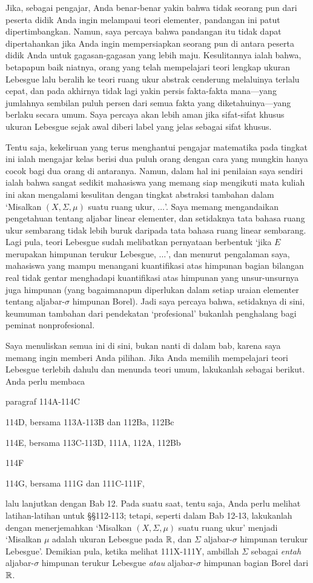 Jika, sebagai pengajar, Anda benar-benar yakin bahwa tidak seorang pun
dari peserta didik Anda ingin melampaui teori elementer, pandangan ini
patut dipertimbangkan. Namun, saya percaya bahwa pandangan itu tidak dapat
dipertahankan jika Anda ingin mempersiapkan seorang pun di antara peserta
didik Anda untuk gagasan-gagasan yang lebih maju. Kesulitannya ialah bahwa, betapapun baik
niatnya, orang yang telah mempelajari teori lengkap ukuran Lebesgue lalu
beralih ke teori ruang ukur abstrak cenderung melaluinya terlalu cepat,
dan pada akhirnya tidak lagi yakin persis fakta-fakta mana—yang jumlahnya
sembilan puluh persen dari semua fakta yang diketahuinya—yang berlaku secara
umum. Saya percaya akan lebih aman jika
sifat-sifat khusus ukuran Lebesgue sejak awal diberi label yang jelas
sebagai sifat khusus.

Tentu saja, kekeliruan yang terus menghantui pengajar matematika pada
tingkat ini ialah mengajar kelas berisi dua puluh orang dengan cara yang
mungkin hanya cocok bagi dua orang di antaranya. Namun, dalam hal ini
penilaian saya sendiri ialah bahwa sangat sedikit mahasiswa yang memang
siap mengikuti mata kuliah ini akan mengalami kesulitan dengan tingkat
abstraksi tambahan dalam `Misalkan $(X,\Sigma,\mu)$ suatu ruang ukur,
$\ldots$'. Saya memang mengandaikan pengetahuan tentang aljabar linear
elementer, dan setidaknya tata bahasa ruang ukur sembarang tidak lebih
buruk daripada tata bahasa ruang linear sembarang. Lagi pula, teori
Lebesgue sudah melibatkan pernyataan berbentuk `jika $E$ merupakan
himpunan terukur Lebesgue, $\ldots$', dan menurut pengalaman saya,
mahasiswa yang mampu menangani kuantifikasi atas himpunan bagian bilangan
real tidak gentar menghadapi kuantifikasi atas himpunan yang
unsur-unsurnya juga himpunan (yang bagaimanapun diperlukan dalam setiap
uraian elementer tentang aljabar-$\sigma$ himpunan Borel). Jadi saya
percaya bahwa, setidaknya di sini, keumuman tambahan dari pendekatan
`profesional' bukanlah penghalang bagi peminat nonprofesional.

Saya menuliskan semua ini di sini, bukan nanti di dalam bab, karena saya
memang ingin memberi Anda pilihan. Jika Anda memilih mempelajari teori
Lebesgue terlebih dahulu dan menunda teori umum, lakukanlah sebagai
berikut. Anda perlu membaca

\qquad paragraf 114A-114C %

\qquad 114D, bersama 113A-113B dan 112Ba, 112Bc

\qquad 114E, bersama 113C-113D, 111A, 112A, 112Bb

\qquad 114F

\qquad 114G, bersama 111G dan 111C-111F, %

\noindent lalu lanjutkan dengan Bab 12. Pada suatu saat, tentu saja, Anda
perlu melihat latihan-latihan untuk \S\S112-113; tetapi, seperti dalam Bab
12-13, lakukanlah dengan menerjemahkan `Misalkan $(X,\Sigma,\mu)$ suatu
ruang ukur' menjadi `Misalkan $\mu$ adalah ukuran Lebesgue pada $\Bbb R$,
dan $\Sigma$ aljabar-$\sigma$ himpunan terukur Lebesgue'. Demikian pula,
ketika melihat 111X-111Y, ambillah $\Sigma$ sebagai {\it entah}
aljabar-$\sigma$ himpunan terukur Lebesgue {\it atau} aljabar-$\sigma$
himpunan bagian Borel dari $\Bbb R$.

\discrpage
